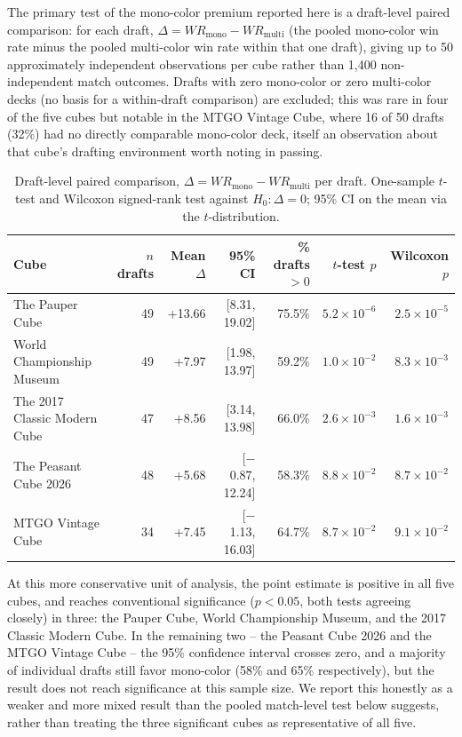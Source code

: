 \documentclass[11pt]{article}
\begin{document}
The primary test of the mono-color premium reported here is a draft-level paired
comparison: for each draft, $\Delta = WR_{\text{mono}} - WR_{\text{multi}}$ (the
pooled mono-color win rate minus the pooled multi-color win rate within that one
draft), giving up to 50 approximately independent observations per cube rather
than 1{,}400 non-independent match outcomes. Drafts with zero mono-color or zero
multi-color decks (no basis for a within-draft comparison) are excluded; this
was rare in four of the five cubes but notable in the MTGO Vintage Cube, where 16
of 50 drafts (32\%) had no directly comparable mono-color deck, itself an
observation about that cube's drafting environment worth noting in passing.

\begin{table}[h]
\centering
\caption{Draft-level paired comparison, $\Delta = WR_{\text{mono}} -
WR_{\text{multi}}$ per draft. One-sample $t$-test and Wilcoxon signed-rank test
against $H_0: \Delta = 0$; 95\% CI on the mean via the $t$-distribution.}
\label{tab:draftlevel}
\footnotesize
\begin{tabular}{lrrrrrr}
\toprule
Cube & $n$ drafts & Mean $\Delta$ & 95\% CI & \% drafts $>0$ & $t$-test $p$ & Wilcoxon $p$ \\
\midrule
The Pauper Cube & 49 & +13.66 & [8.31, 19.02] & 75.5\% & $5.2\times10^{-6}$ & $2.5\times10^{-5}$ \\
World Championship Museum & 49 & +7.97 & [1.98, 13.97] & 59.2\% & $1.0\times10^{-2}$ & $8.3\times10^{-3}$ \\
The 2017 Classic Modern Cube & 47 & +8.56 & [3.14, 13.98] & 66.0\% & $2.6\times10^{-3}$ & $1.6\times10^{-3}$ \\
The Peasant Cube 2026 & 48 & +5.68 & [$-$0.87, 12.24] & 58.3\% & $8.8\times10^{-2}$ & $8.7\times10^{-2}$ \\
MTGO Vintage Cube & 34 & +7.45 & [$-$1.13, 16.03] & 64.7\% & $8.7\times10^{-2}$ & $9.1\times10^{-2}$ \\
\bottomrule
\end{tabular}
\end{table}

At this more conservative unit of analysis, the point estimate is positive in
all five cubes, and reaches conventional significance ($p<0.05$, both tests
agreeing closely) in three: the Pauper Cube, World Championship Museum, and the
2017 Classic Modern Cube. In the remaining two -- the Peasant Cube 2026 and the
MTGO Vintage Cube -- the 95\% confidence interval crosses zero, and a majority of
individual drafts still favor mono-color (58\% and 65\% respectively), but the
result does not reach significance at this sample size. We report this
honestly as a weaker and more mixed result than the pooled match-level test
below suggests, rather than treating the three significant cubes as
representative of all five.
\end{document}
